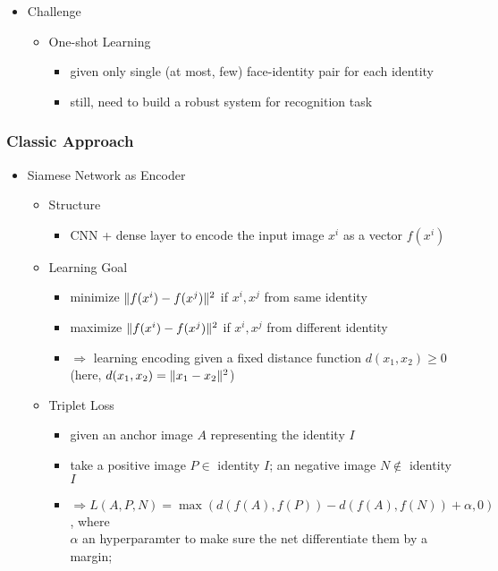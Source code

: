 \begin{itemize}
\item Challenge
	\begin{itemize}
	\item One-shot Learning
		\begin{itemize}
		\item given only single (at most, few) face-identity pair for each identity
		\item still, need to build a robust system for recognition task
		\end{itemize}
	\end{itemize}
\end{itemize}

\subsubsection{Classic Approach}
\begin{itemize}
\item Siamese Network as Encoder
	\begin{itemize}
	\item Structure
		\begin{itemize}
		\item CNN + dense layer to encode the input image $x^i$ as a vector $f(x^i)$
		\end{itemize}
	\item Learning Goal
		\begin{itemize}
		\item minimize $\lVert f(x^i)-f(x^j)\rVert^2$ if $x^i, x^j$ from same identity
		\item maximize $\lVert f(x^i)-f(x^j)\rVert^2$ if $x^i, x^j$ from different identity
		\item $\Rightarrow$ learning encoding given a fixed distance function $d(x_1, x_2) \ge 0$\\
		(here, $d(x_1, x_2)=\lVert x_1-x_2\rVert^2$)
		\end{itemize}
	\item Triplet Loss
		\begin{itemize}
		\item given an anchor image $A$ representing the identity $I$
		\item take a positive image $P\in$ identity $I$; an negative image $N\not\in$ identity $I$
		\item $\Rightarrow L(A,P,N) = \max\left( d(f(A), f(P)) - d(f(A), f(N)) + \alpha, 0 \right)$, where \\
		$\alpha$ an hyperparamter to make sure the net differentiate them by a margin; \\

\end{itemize}
\end{itemize}
\end{itemize}
